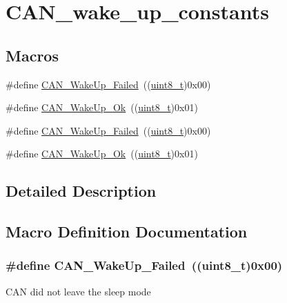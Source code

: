 \hypertarget{group___c_a_n__wake__up__constants}{}\section{C\+A\+N\+\_\+wake\+\_\+up\+\_\+constants}
\label{group___c_a_n__wake__up__constants}
\subsection*{Macros}
\begin{DoxyCompactItemize}
\item 
\#define \hyperlink{group___c_a_n__wake__up__constants_ga837fd7ad47fee78e43a186544e2b390b}{C\+A\+N\+\_\+\+Wake\+Up\+\_\+\+Failed}~((\hyperlink{_p_e___types_8h_aba7bc1797add20fe3efdf37ced1182c5}{uint8\+\_\+t})0x00)
\item 
\#define \hyperlink{group___c_a_n__wake__up__constants_ga152e4935cf85bdfb803eb36b656cd690}{C\+A\+N\+\_\+\+Wake\+Up\+\_\+\+Ok}~((\hyperlink{_p_e___types_8h_aba7bc1797add20fe3efdf37ced1182c5}{uint8\+\_\+t})0x01)
\item 
\#define \hyperlink{group___c_a_n__wake__up__constants_ga837fd7ad47fee78e43a186544e2b390b}{C\+A\+N\+\_\+\+Wake\+Up\+\_\+\+Failed}~((\hyperlink{_p_e___types_8h_aba7bc1797add20fe3efdf37ced1182c5}{uint8\+\_\+t})0x00)
\item 
\#define \hyperlink{group___c_a_n__wake__up__constants_ga152e4935cf85bdfb803eb36b656cd690}{C\+A\+N\+\_\+\+Wake\+Up\+\_\+\+Ok}~((\hyperlink{_p_e___types_8h_aba7bc1797add20fe3efdf37ced1182c5}{uint8\+\_\+t})0x01)
\end{DoxyCompactItemize}


\subsection{Detailed Description}


\subsection{Macro Definition Documentation}
\subsubsection[{\texorpdfstring{C\+A\+N\+\_\+\+Wake\+Up\+\_\+\+Failed}{CAN_WakeUp_Failed}}]{\setlength{\rightskip}{0pt plus 5cm}\#define C\+A\+N\+\_\+\+Wake\+Up\+\_\+\+Failed~(({\bf uint8\+\_\+t})0x00)}\hypertarget{group___c_a_n__wake__up__constants_ga837fd7ad47fee78e43a186544e2b390b}{}\label{group___c_a_n__wake__up__constants_ga837fd7ad47fee78e43a186544e2b390b}
C\+AN did not leave the sleep mode 

